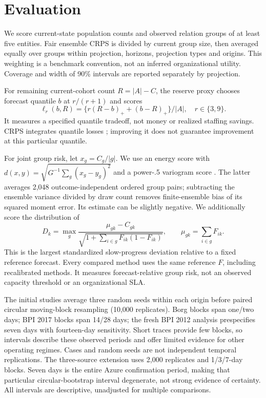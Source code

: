 \section{Evaluation}
We score current-state population counts and observed relation groups of at
least five entities. Fair ensemble CRPS \citep{ferro2014} is divided by current
group size, then averaged equally over groups within projection, horizons,
projection types and origins. This weighting is a benchmark convention, not
an inferred organizational utility. Coverage and width of 90\% intervals are
reported separately by projection.

For remaining current-cohort count $R=|A|-C$, the reserve proxy chooses forecast
quantile $b$ at $r/(r+1)$ and scores
\begin{equation}
 \ell_r(b,R)=\{r(R-b)_++(b-R)_+\}/|A|,\quad r\in\{3,9\}.
\end{equation}
It measures a specified quantile tradeoff, not money or realized staffing
savings. CRPS integrates quantile losses \citep{gneiting2007}; improving it
does not guarantee improvement at this particular quantile.

For joint group risk, let $x_g=C_g/|g|$. We use an energy score with
$d(x,y)=\sqrt{G^{-1}\sum_g(x_g-y_g)^2}$ and a power-.5 variogram score
\citep{scheuerer2015}. The latter averages 2,048 outcome-independent ordered
group pairs; subtracting the ensemble variance divided by draw count removes
finite-ensemble bias of its squared moment error. Its estimate can be slightly
negative. We additionally score the distribution of
\begin{equation}
 D_k=\max_g\frac{\mu_{gk}-C_{gk}}
 {\sqrt{1+\sum_{i\in g}F_{ik}(1-F_{ik})}},
 \qquad \mu_{gk}=\sum_{i\in g}F_{ik}.
\end{equation}
This is the largest standardized slow-progress deviation relative to a
fixed reference forecast. Every compared method uses the same reference
$F$, including recalibrated methods. It measures forecast-relative group
risk, not an observed capacity threshold or an organizational SLA.

The initial studies average three random seeds within each origin before paired circular
moving-block resampling (10,000 replicates). Borg blocks span one/two days;
BPI 2017 blocks span 14/28 days; the fresh BPI 2012 analysis prespecifies
seven days with fourteen-day sensitivity. Short traces provide few blocks,
so intervals describe these observed periods and offer limited evidence for
other operating regimes. Cases and random seeds are not independent temporal
replications. The three-source extension uses 2,000 replicates and 1/3/7-day
blocks. Seven days is the entire Azure confirmation period, making that
particular circular-bootstrap interval degenerate, not strong evidence of
certainty. All intervals are descriptive, unadjusted for multiple comparisons.
